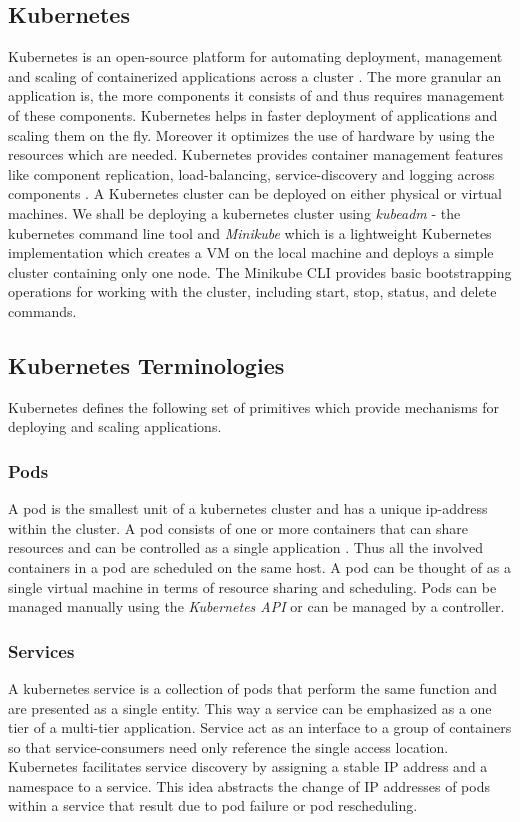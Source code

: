 \documentclass[9pt,twocolumn,twoside]{../../styles/osajnl}
\begin{document}
\subsection{Kubernetes}
Kubernetes is an open-source platform for automating deployment,
management and scaling of containerized applications across a cluster
\cite{www-wiki-kubernetes}. The more granular an application is, the
more components it consists of and thus requires management of these
components. Kubernetes helps in faster deployment of applications and
scaling them on the fly. Moreover it optimizes the use of hardware by
using the resources which are needed. Kubernetes provides container
management features like component replication, load-balancing,
service-discovery and logging across components
\cite{www-kubernetes-architecture}. A Kubernetes cluster can be
deployed on either physical or virtual machines. We shall be deploying
a kubernetes cluster using \emph{kubeadm} - the kubernetes command
line tool and \emph{Minikube} which is a lightweight Kubernetes
implementation which creates a VM on the local machine and deploys a
simple cluster containing only one node. The Minikube CLI provides
basic bootstrapping operations for working with the cluster, including
start, stop, status, and delete commands.

\subsection{Kubernetes Terminologies}
Kubernetes defines the following set of primitives which provide
mechanisms for deploying and scaling applications.

\subsubsection{Pods}
A pod is the smallest unit of a kubernetes cluster and has a unique
ip-address within the cluster. A pod consists of one or more
containers that can share resources and can be controlled as a single
application \cite{www-wiki-kubernetes}
\cite{www-kubernetes-digitalocean}. Thus all the involved containers
in a pod are scheduled on the same host. A pod can be thought of as a
single virtual machine in terms of resource sharing and scheduling.
Pods can be managed manually using the \emph{Kubernetes API} or can be
managed by a controller.

\subsubsection{Services}
A kubernetes service is a collection of pods that perform the same
function and are presented as a single entity. This way a service can
be emphasized as a one tier of a multi-tier application. Service act
as an interface to a group of containers so that service-consumers
need only reference the single access location. Kubernetes facilitates
service discovery by assigning a stable IP address and a namespace to
a service. This idea abstracts the change of IP addresses of pods
within a service that result due to pod failure or pod rescheduling.
\end{document}
